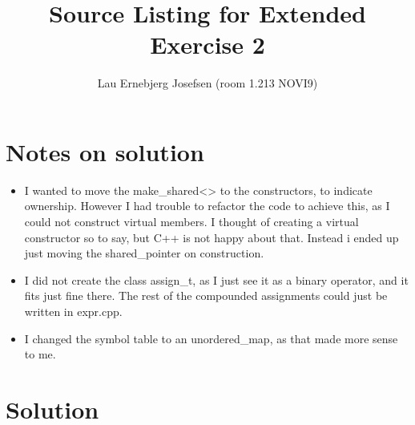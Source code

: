 \documentclass[a4paper]{report}
\title{Source Listing for Extended Exercise 2}
\author{Lau Ernebjerg Josefsen (room 1.213 NOVI9)}
\begin{document}
\maketitle
\section{Notes on solution}
\begin{itemize}
    \item I wanted to move the make\_shared<> to the constructors, to indicate ownership. However I had trouble to refactor the code to achieve this, as I could not construct virtual members. I thought of creating a virtual constructor so to say, but C++ is not happy about that. Instead i ended up just moving the shared\_pointer on construction.
    \item I did not create the class assign\_t, as I just see it as a binary operator, and it fits just fine there. The rest of the compounded assignments could just be written in expr.cpp.
    \item I changed the symbol table to an unordered\_map, as that made more sense to me.
\end{itemize}
\section{Solution}








\end{document}
